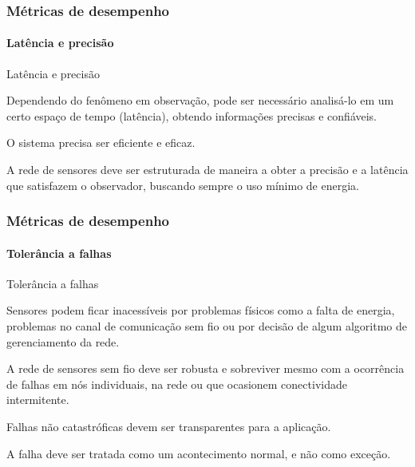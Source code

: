 \documentclass[notes]{beamer}
\begin{document}
\begin{frame}
\label{slide_27}
\frametitle{Métricas de desempenho}
\framesubtitle{Latência e precisão}

\begin{block}{Latência e precisão}

Dependendo do fenômeno em observação, pode ser necessário analisá-lo em um certo espaço de tempo (latência), obtendo informações precisas e confiáveis. 
\end{block} \pause

\begin{block}

O sistema precisa ser eficiente e eficaz.
\end{block} \pause

\begin{block}

A rede de sensores deve ser estruturada de maneira a obter a precisão e a latência que satisfazem o observador, buscando sempre o uso mínimo de energia. 

\end{block}

\end{frame}

\begin{frame}
\label{slide_28}
\frametitle{Métricas de desempenho}
\framesubtitle{Tolerância a falhas}

\begin{block}{Tolerância a falhas}

Sensores podem ficar inacessíveis por problemas físicos como a falta de energia, problemas no canal de comunicação sem fio ou por decisão de algum algoritmo de gerenciamento da rede.
\end{block} \pause

\begin{alertblock}

A rede de sensores sem fio deve ser robusta e sobreviver mesmo com a ocorrência de falhas em nós individuais, na rede ou que ocasionem conectividade intermitente. 
\end{alertblock} \pause

\begin{alertblock}

Falhas não catastróficas devem ser transparentes para a aplicação. 

\end{alertblock} \pause

\begin{alertblock}

A falha deve ser tratada como um acontecimento normal, e não como exceção.

\end{alertblock} 

\end{frame}
\end{document}
